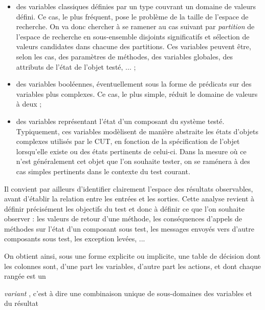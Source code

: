 \begin{itemize}
       
\item des variables classiques d\'efinies par un type couvrant un
       domaine de valeurs d\'efini. Ce cas, le plus fr\'equent, pose le
       probl\`eme de la taille de l'espace de recherche. On va donc
       chercher \`a se ramener au cas suivant par 
\emph{partition}
   de l'espace de
       recherche en sous-ensemble disjoints significatifs et s\'election
       de valeurs candidates dans chacune des partitions. Ces variables
       peuvent \^etre, selon les cas, des param\`etres de m\'ethodes, des
       variables globales, des attributs de l'\'etat de l'objet test\'e, ... ; 
\item des variables bool\'eennes, \'eventuellement sous la forme de
       pr\'edicats sur des variables  plus complexes. Ce cas, le plus
       simple, r\'eduit le domaine de valeurs \`a deux
       ; 
\item des variables repr\'esentant l'\'etat d'un composant du syst\`eme
       test\'e. Typiquement, ces variables mod\`elisent de mani\`ere abstraite
       les \'etats d'objets complexes utilis\'es par le CUT, en fonction de
       la sp\'ecification de l'objet lorsqu'elle existe ou des \'etats
       pertinents de celui-ci. Dans la mesure o\`u ce n'est g\'en\'eralement
       cet objet que l'on souhaite tester, on se ram\'enera \`a des cas
       simples pertinents dans le contexte du test courant.
\end{itemize}
  
\par
  Il convient par ailleurs d'identifier clairement l'espace
     des r\'esultats observables, avant d'\'etablir la relation entre les
     entr\'ees et les sorties. Cette analyse revient \`a d\'efinir pr\'ecis\'ement
     les objectifs du test et donc \`a d\'efinir ce que l'on souhaite
     observer : les valeurs de retour d'une m\'ethode, les cons\'equences
     d'appels de m\'ethodes sur l'\'etat d'un composant sous test, les
     messages envoy\'es vers d'autre composants sous test, les exception
     lev\'ees, ...
    
\par
  
     On obtient ainsi, sous une forme explicite ou implicite, une
     table de d\'ecision dont les colonnes sont, d'une part les
     variables, d'autre part les actions, et dont chaque rang\'ee est un
     
\emph{variant}
  , c'est \`a dire une combinaison unique de
     sous-domaines des variables et du r\'esultat
    
